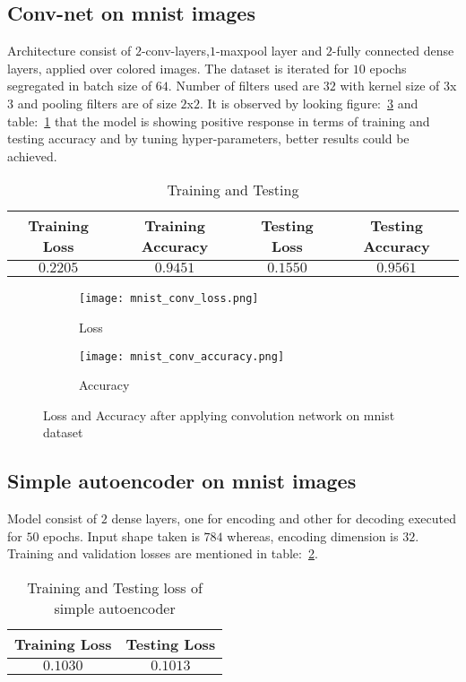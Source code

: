 \documentclass[12pt,a4paper,titlepage]{report}
\begin{document}
\subsection{Conv-net on mnist images}
Architecture consist of $2$-conv-layers,$1$-maxpool layer and $2$-fully connected dense layers, applied over colored images. The dataset is iterated for $10$ epochs segregated in batch size of $64$. Number of filters used are $32$ with kernel size of $3$x$3$ and pooling filters are of size $2$x$2$. It is observed by looking figure:~\ref{fig: Image11} and table:~\ref{tab: Table-17} that the model is showing positive response in terms of training and testing accuracy and by tuning hyper-parameters, better results could be achieved.
\vspace{20pt}
\begin{table}[H]
\centering
\caption{Training and Testing}
\label{tab: Table-17}
\begin{tabular}{c c c c}
\hline
\textbf{Training Loss} & \textbf{Training Accuracy} & \textbf{Testing Loss} & \textbf{Testing Accuracy}\\
\hline
$0.2205$ & $0.9451$ & $0.1550$ & $0.9561$\\
\hline
\end{tabular}
\end{table}

\begin{figure}[H]
\centering
\begin{subfigure}[h]{0.45\linewidth}
\texttt{[image: mnist\_conv\_loss.png]}
\caption{Loss}
\label{fig:a}
\end{subfigure}
\quad
\begin{subfigure}[h]{0.45\linewidth}
\texttt{[image: mnist\_conv\_accuracy.png]}
\caption{Accuracy}
\label{fig:b}
\end{subfigure}
\caption{Loss and Accuracy after applying convolution network on mnist dataset}
\label{fig: Image11}
\end{figure}

\subsection{Simple autoencoder on mnist images}
Model consist of $2$ dense layers, one for encoding and other for decoding executed for $50$ epochs. Input shape taken is $784$ whereas, encoding dimension is $32$. Training and validation losses are mentioned in table:~\ref{tab: Table-18}. 
\vspace{20pt}
\begin{table}[H]
\centering
\caption{Training and Testing loss of simple autoencoder}
\label{tab: Table-18}
\begin{tabular}{c c}
\hline
\textbf{Training Loss} & \textbf{Testing Loss}\\
\hline
$0.1030$ & $0.1013$\\
\hline
\end{tabular}
\end{table}
\end{document}
